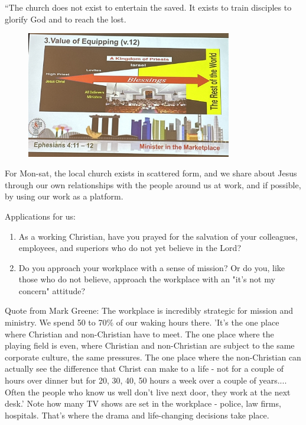 \begin{itemize}
  \item{“The church does not exist to entertain the saved. It exists to train disciples to glorify God and to reach the lost.
  \begin{figure}
    \centering
    \includegraphics[width=0.8\textwidth, trim={0cm 0cm 0cm 0cm},clip]{Figures/novemberSermon3Fig1.jpg}
    \caption[]{}
  \end{figure}
  }
  \item{For Mon-sat, the local church exists in scattered form, and we share about Jesus through our own relationships with the people around us at work, and if possible, by using our work as a platform.}
  \item{Applications for us:
  \begin{enumerate}
    \item{As a working Christian, have you prayed for the salvation of your colleagues, employees, and superiors who do not yet believe in the Lord?}
    \item{Do you approach your workplace with a sense of mission? Or do you, like those who do not believe, approach the workplace with an "it's not my concern" attitude?}
  \end{enumerate}
  \item{Quote from Mark Greene: The workplace is incredibly strategic for
  mission and ministry. We spend 50 to 70\% of our waking hours there. 'It's
  the one place where Christian and non-Christian have to meet. The one place
  where the playing field is even, where Christian and non-Christian are
  subject to the same corporate culture, the same pressures. The one place
  where the non-Christian can actually see the difference that Christ can
  make to a life - not for a couple of hours over dinner but for 20, 30, 40,
  50 hours a week over a couple of years.... Often the people who know us
  well don't live next door, they work at the next desk.' Note how many TV
  shows are set in the workplace - police, law firms, hospitals. That's where
  the drama and life-changing decisions take place.}
  }
\end{itemize}